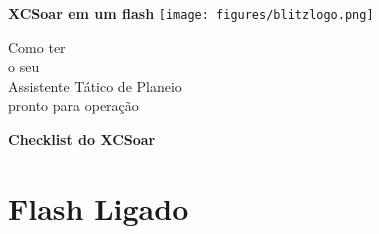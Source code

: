 \documentclass[a4paper,12pt,utf8]{scrreprt}
\begin{document}
%
%
%
\pagestyle{empty}
\begin{center}
\fontsize{34}{0}
\selectfont\textbf{XCSoar em um flash}
\fontsize{12}{12}
\vspace{0.1em}
\texttt{[image: figures/blitzlogo.png]}

\vspace{1em}
{\Huge Como ter\\}
\vspace{0.2em}
{\tiny o seu\\}
{Assistente Tático de Planeio\\}
\vspace{0.2em}
{\tiny pronto para operação }
\end{center}

\newpage
{}
\pagestyle{fancy}
\begin{center}
{\Huge\textbf{Checklist do XCSoar }}
\end{center}
\section*{Flash \textcolor{flashyellow}{Ligado}}\label{ch:flashon}
\end{document}
